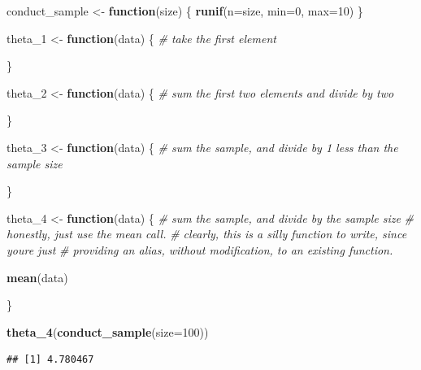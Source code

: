 \documentclass[
]{article}
\newenvironment{Shaded}{\begin{snugshade}}{\end{snugshade}}
\newcommand{\AttributeTok}[1]{\textcolor[rgb]{0.13,0.29,0.53}{#1}}
\newcommand{\CommentTok}[1]{\textcolor[rgb]{0.56,0.35,0.01}{\textit{#1}}}
\newcommand{\ControlFlowTok}[1]{\textcolor[rgb]{0.13,0.29,0.53}{\textbf{#1}}}
\newcommand{\DecValTok}[1]{\textcolor[rgb]{0.00,0.00,0.81}{#1}}
\newcommand{\FunctionTok}[1]{\textcolor[rgb]{0.13,0.29,0.53}{\textbf{#1}}}
\newcommand{\NormalTok}[1]{#1}
\newcommand{\OtherTok}[1]{\textcolor[rgb]{0.56,0.35,0.01}{#1}}
\theoremstyle{definition}
\theoremstyle{definition}
\theoremstyle{definition}
\theoremstyle{definition}
\theoremstyle{remark}
\begin{document}
\begin{Shaded}
\begin{Highlighting}[]
\NormalTok{conduct\_sample }\OtherTok{\textless{}{-}} \ControlFlowTok{function}\NormalTok{(size) \{ }
  \FunctionTok{runif}\NormalTok{(}\AttributeTok{n=}\NormalTok{size, }\AttributeTok{min=}\DecValTok{0}\NormalTok{, }\AttributeTok{max=}\DecValTok{10}\NormalTok{)}
\NormalTok{\}}
\end{Highlighting}
\end{Shaded}

\begin{Shaded}
\begin{Highlighting}[]
\NormalTok{theta\_1 }\OtherTok{\textless{}{-}} \ControlFlowTok{function}\NormalTok{(data) \{ }
  \CommentTok{\# take the first element}
  
\NormalTok{\}}

\NormalTok{theta\_2 }\OtherTok{\textless{}{-}} \ControlFlowTok{function}\NormalTok{(data) \{ }
  \CommentTok{\# sum the first two elements and divide by two}
  
\NormalTok{\}}

\NormalTok{theta\_3 }\OtherTok{\textless{}{-}} \ControlFlowTok{function}\NormalTok{(data) \{ }
  \CommentTok{\# sum the sample, and divide by 1 less than the sample size}
  
\NormalTok{\}}

\NormalTok{theta\_4 }\OtherTok{\textless{}{-}} \ControlFlowTok{function}\NormalTok{(data) \{ }
  \CommentTok{\# sum the sample, and divide by the sample size }
  \CommentTok{\# honestly, just use the mean call. }
  \CommentTok{\# clearly, this is a silly function to write, since you\textquotesingle{}re just }
  \CommentTok{\# providing an alias, without modification, to an existing function. }
  
  \FunctionTok{mean}\NormalTok{(data)}
  
\NormalTok{\}}
\end{Highlighting}
\end{Shaded}

\begin{Shaded}
\begin{Highlighting}[]
\FunctionTok{theta\_4}\NormalTok{(}\FunctionTok{conduct\_sample}\NormalTok{(}\AttributeTok{size=}\DecValTok{100}\NormalTok{))}
\end{Highlighting}
\end{Shaded}

\begin{verbatim}
## [1] 4.780467
\end{verbatim}
\end{document}
